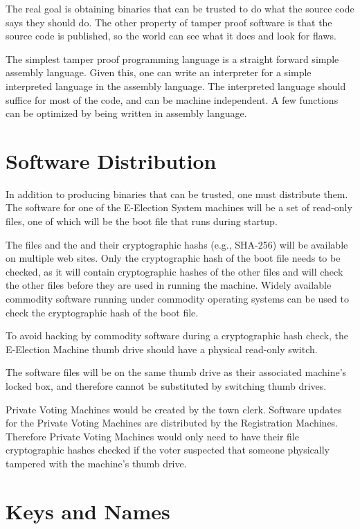 \documentclass[12pt]{article}
\begin{document}
The real goal is obtaining binaries that can be trusted to
do what the source code says they should do.  The other
property of tamper proof software is that the source code
is published, so the world can see what it does and look
for flaws.

The simplest tamper proof programming language is a straight
forward simple assembly language.  Given this, one can write
an interpreter for a simple interpreted language in the
assembly language.  The interpreted language should suffice
for most of the code, and can be machine independent.
A few functions can be optimized by being written in assembly
language.

\section{Software Distribution}

In addition to producing binaries that can be trusted, one
must distribute them.  The software for one of the E-Election
System machines will be a set of read-only files, one of which will be
the boot file that runs during startup.

The files and the
and their cryptographic hashs (e.g., SHA-256) will be available on multiple
web sites.  Only the cryptographic hash of the boot file needs to be checked,
as it will contain cryptographic hashes of the other files and will check
the other files before they are used in running the machine.
Widely available commodity software running under commodity operating systems
can be used to check the cryptographic hash of the boot file.

To avoid hacking by commodity software during a cryptographic hash check,
the E-Election Machine thumb drive should have a physical read-only
switch.

The software files will be on
the same thumb drive as their associated machine's locked box, and
therefore cannot be substituted by switching thumb drives.

Private Voting Machines would be created by the town clerk.
Software updates for the Private Voting Machines are distributed
by the Registration Machines.  Therefore Private Voting Machines
would only need to have their file cryptographic hashes checked if the voter
suspected that someone physically tampered with the machine's thumb drive.



\section{Keys and Names}
\end{document}

